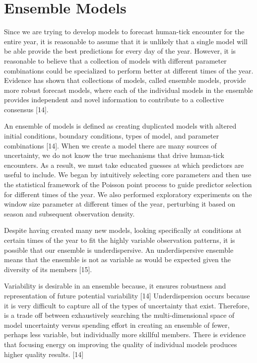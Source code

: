 \section{Ensemble Models}

Since we are trying to develop models to forecast human-tick encounter for the entire year, it is reasonable to assume that it is unlikely that a single model will be able provide the best predictions for every day of the year. However, it is reasonable to believe that a collection of models with different parameter combinations could be specialized to perform better at different times of the year. Evidence has shown that collections of models, called ensemble models, provide more robust forecast models, where each of the individual models in the ensemble provides independent and novel information to contribute to a collective consensus [14]. \newline

\noindent An ensemble of models is defined as creating duplicated models with altered initial conditions, boundary conditions, types of model, and parameter combinations [14]. When we create a model there are many sources of uncertainty, we do not know the true mechanisms that drive human-tick encounters. As a result, we must take educated guesses at which predictors are useful to include. We began by intuitively selecting core parameters and then use the statistical framework of the Poisson point process to guide predictor selection for different times of the year.  We also performed exploratory experiments on the window size parameter at different times of the year, perturbing it based on season and subsequent observation density.  \newline

\noindent Despite having created many new models, looking specifically at conditions at certain times of the year to fit the highly variable observation patterns, it is possible that our ensemble is underdispersive. An underdispersive ensemble means that the ensemble is not as variable as would be expected given the diversity of its members [15]. \newline

\noindent Variability is desirable in an ensemble because, it ensures robustness and representation of future potential variability [14] Underdispersion occurs because it is very difficult to capture all of the types of uncertainty that exist. Therefore, is a trade off between exhaustively searching the multi-dimensional space of model uncertainty versus spending effort in creating an ensemble of fewer, perhaps less variable, but individually more skillful members. There is evidence that focusing energy on improving the quality of individual models produces higher quality results. [14]


